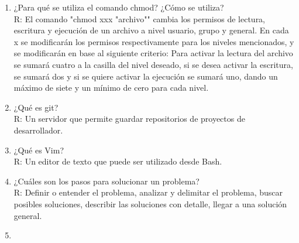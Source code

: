 \documentclass[letterpaper, 12pt, oneside]{article} %
\begin{document}
\begin{enumerate}
		\item ¿Para qué se utiliza el comando chmod? ¿Cómo se utiliza?\\R: El comando "chmod xxx "archivo"" cambia los permisos de lectura, escritura y ejecución de un archivo a nivel usuario, grupo y general. En cada x se modificarán los permisos respectivamente para los niveles mencionados, y se modificarán en base al siguiente criterio: Para activar la lectura del archivo se sumará cuatro a la casilla del nivel deseado, si se desea activar la escritura, se sumará dos y si se quiere activar la ejecución se sumará uno, dando un máximo de siete y un mínimo de cero para cada nivel.\\
		\item ¿Qué es git?\\R: Un servidor que permite guardar repositorios de proyectos de desarrollador.\\
		\item ¿Qué es Vim?\\R: Un editor de texto que puede ser utilizado desde Bash.\\
		\item ¿Cuáles son los pasos para solucionar un problema?\\R: Definir o entender el problema, analizar y delimitar el problema, buscar posibles soluciones, describir las soluciones con detalle, llegar a una solución general.\\
		\item 
	\end{enumerate}
\end{document}
